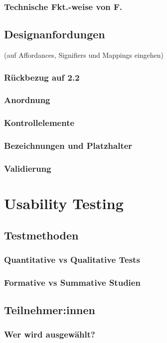 \documentclass[a4paper, 12pt, oneside, BCOR=1cm,toc=chapterentrywithdots]{scrbook}
\begin{document}
\subsubsection{Technische Fkt.-weise von F.}
\subsection{Designanfordungen}
\cite{normanDesignEveryday2013} (auf Affordances, Signifiers und Mappings eingehen)
\subsubsection{Rückbezug auf 2.2}
\subsubsection{Anordnung}
\subsubsection{Kontrollelemente}
\subsubsection{Bezeichnungen und Platzhalter}
\subsubsection{Validierung}

\clearpage
\section{Usability Testing}

\subsection{Testmethoden}
\subsubsection{Quantitative vs Qualitative Tests}
\subsubsection{Formative vs Summative Studien}
\subsection{Teilnehmer:innen}
\subsubsection{Wer wird ausgewählt?}
\end{document}
